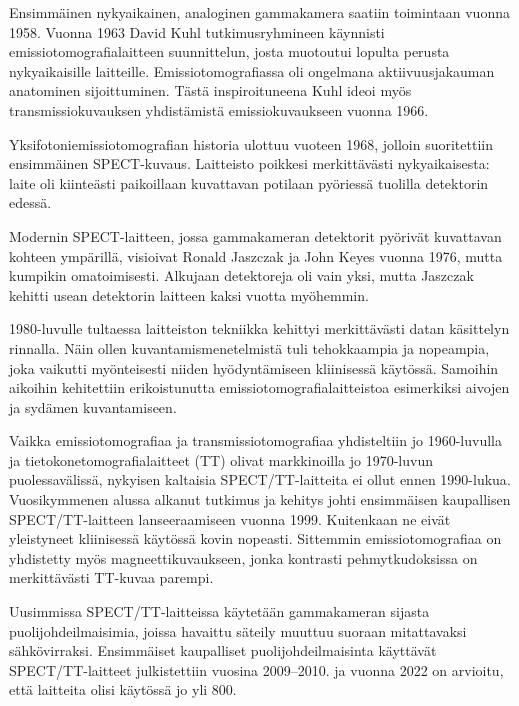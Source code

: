 Ensimmäinen nykyaikainen, analoginen gammakamera saatiin toimintaan vuonna 1958\cite{hutton_origins_2014, cherry_gamma_2012}. Vuonna 1963 David Kuhl tutkimusryhmineen käynnisti emissiotomografialaitteen suunnittelun, josta muotoutui lopulta perusta nykyaikaisille laitteille\cite{jaszczak_early_2006, hutton_origins_2014}. Emissiotomografiassa oli ongelmana aktiivuusjakauman anatominen sijoittuminen. Tästä inspiroituneena Kuhl ideoi myös transmissiokuvauksen yhdistämistä emissiokuvaukseen vuonna 1966\cite{jaszczak_early_2006}.

Yksifotoniemissiotomografian historia ulottuu vuoteen 1968, jolloin suoritettiin ensimmäinen SPECT-kuvaus. Laitteisto poikkesi merkittävästi nykyaikaisesta: laite oli kiinteästi paikoillaan kuvattavan potilaan pyöriessä tuolilla detektorin edessä.\cite{jaszczak_early_2006, hutton_origins_2014}

Modernin SPECT-laitteen, jossa gammakameran detektorit pyörivät kuvattavan kohteen ympärillä, visioivat Ronald Jaszczak ja John Keyes vuonna 1976, mutta kumpikin omatoimisesti\cite{jaszczak_early_2006}. Alkujaan detektoreja oli vain yksi, mutta Jaszczak kehitti usean detektorin laitteen kaksi vuotta myöhemmin\cite{jaszczak_early_2006, hutton_origins_2014}.

1980-luvulle tultaessa laitteiston tekniikka kehittyi merkittävästi datan käsittelyn rinnalla. Näin ollen kuvantamismenetelmistä tuli tehokkaampia ja nopeampia, joka vaikutti myönteisesti niiden hyödyntämiseen kliinisessä käytössä\cite{jaszczak_early_2006}. Samoihin aikoihin kehitettiin erikoistunutta emissiotomografialaitteistoa esimerkiksi aivojen ja sydämen kuvantamiseen\cite{hutton_origins_2014}.

Vaikka emissiotomografiaa ja transmissiotomografiaa yhdisteltiin jo 1960-luvulla ja tietokonetomografialaitteet (TT) olivat markkinoilla jo 1970-luvun puolessavälissä, nykyisen kaltaisia SPECT/TT-laitteita ei ollut ennen 1990-lukua\cite{bercovich_medical_2018, hutton_origins_2014}. Vuosikymmenen alussa alkanut tutkimus ja kehitys johti ensimmäisen kaupallisen SPECT/TT-laitteen lanseeraamiseen vuonna 1999. Kuitenkaan ne eivät yleistyneet kliinisessä käytössä kovin nopeasti.\cite{hutton_origins_2014} Sittemmin emissiotomografiaa on yhdistetty myös magneettikuvaukseen, jonka kontrasti pehmytkudoksissa on merkittävästi TT-kuvaa parempi\cite{wettenhovi_omegaopen-source_2021}.

Uusimmissa SPECT/TT-laitteissa käytetään gammakameran sijasta puolijohdeilmaisimia, joissa havaittu säteily muuttuu suoraan mitattavaksi sähkövirraksi. Ensimmäiset kaupalliset puolijohdeilmaisinta käyttävät SPECT/TT-laitteet julkistettiin vuosina 2009--2010.\cite{hutton_origins_2014} ja vuonna 2022 on arvioitu, että laitteita olisi käytössä jo yli 800\cite{slomka_novel_2022}.

